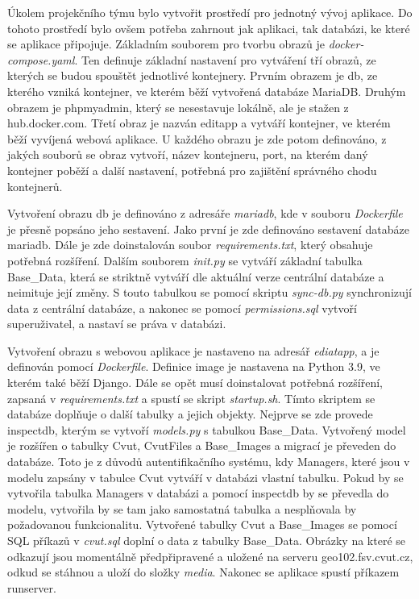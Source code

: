 Úkolem projekčního týmu bylo vytvořit prostředí pro jednotný vývoj
aplikace. Do tohoto prostředí bylo ovšem potřeba zahrnout jak aplikaci,
tak databázi, ke které se aplikace připojuje. Základním souborem pro
tvorbu obrazů je \emph{docker-compose.yaml}. Ten definuje základní
nastavení pro vytváření tří obrazů, ze kterých se budou spouštět
jednotlivé kontejnery. Prvním obrazem je db, ze kterého vzniká
kontejner, ve kterém běží vytvořená databáze MariaDB. Druhým obrazem
je phpmyadmin, který se nesestavuje lokálně, ale je stažen z
hub.docker.com. Třetí obraz je nazván editapp a vytváří kontejner, ve
kterém běží vyvíjená webová aplikace. U každého obrazu je zde potom
definováno, z jakých souborů se obraz vytvoří, název kontejneru, port,
na kterém daný kontejner poběží a další nastavení, potřebná pro
zajištění správného chodu kontejnerů.

Vytvoření obrazu db je definováno z adresáře \emph{mariadb}, kde v
souboru \emph{Dockerfile} je přesně popsáno jeho sestavení. Jako první
je zde definováno sestavení databáze mariadb. Dále je zde doinstalován
soubor \emph{requirements.txt}, který obsahuje potřebná
rozšíření. Dalším souborem \emph{init.py} se vytváří základní tabulka
Base\_Data, která se striktně vytváří dle aktuální verze centrální
databáze a neimituje její změny. S touto tabulkou se pomocí skriptu
\emph{sync-db.py} synchronizují data z centrální databáze, a nakonec
se pomocí \emph{permissions.sql} vytvoří superuživatel, a nastaví se
práva v databázi.

Vytvoření obrazu s webovou aplikace je nastaveno na adresář
\emph{ediatapp}, a je definován pomocí \emph{Dockerfile}. Definice
image je nastavena na Python 3.9, ve kterém také běží Django. Dále se
opět musí doinstalovat potřebná rozšíření, zapsaná v
\emph{requirements.txt} a spustí se skript \emph{startup.sh}. Tímto
skriptem se databáze doplňuje o další tabulky a jejich
objekty. Nejprve se zde provede inspectdb, kterým se vytvoří
\emph{models.py} s tabulkou Base\_Data. Vytvořený model je rozšířen o
tabulky Cvut, CvutFiles a Base\_Images a migrací je převeden do
databáze. Toto je z důvodů autentifikačního systému, kdy Managers,
které jsou v modelu zapsány v tabulce Cvut vytváří v databázi vlastní
tabulku. Pokud by se vytvořila tabulka Managers v databázi a pomocí
inspectdb by se převedla do modelu, vytvořila by se tam jako
samostatná tabulka a nesplňovala by požadovanou
funkcionalitu. Vytvořené tabulky Cvut a Base\_Images se pomocí SQL
příkazů v \emph{cvut.sql} doplní o data z tabulky Base\_Data. Obrázky
na které se odkazují jsou momentálně předpřipravené a uložené na
serveru geo102.fsv.cvut.cz, odkud se stáhnou a uloží do složky
\emph{media}. Nakonec se aplikace spustí příkazem runserver.

